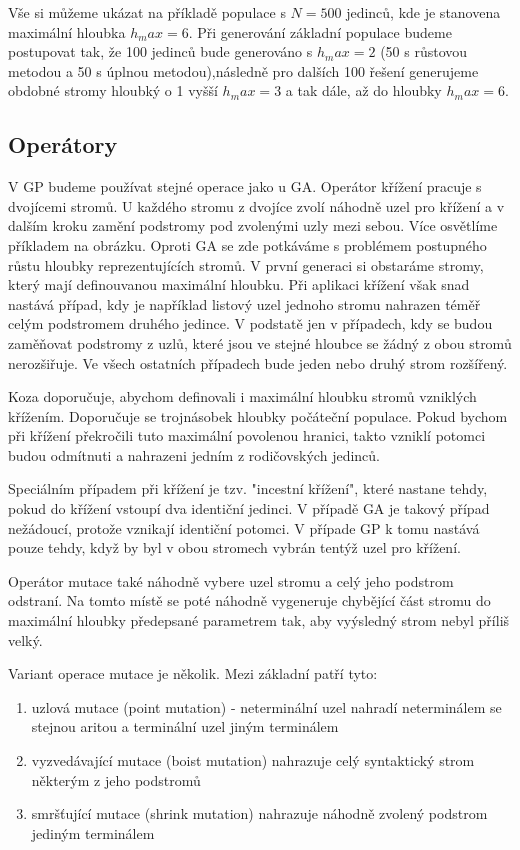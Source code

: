 \documentclass[bc,male,java,dept460]{diploma}		%
\begin{document}
Vše si můžeme ukázat na příkladě populace s $N=500$ jedinců, kde je stanovena maximální hloubka $h_max=6$. Při generování základní populace budeme postupovat tak, že 100 jedinců bude generováno s $h_max=2$ (50 s růstovou metodou a 50 s úplnou metodou),následně pro dalších 100 řešení generujeme obdobné stromy hloubký o 1 vyšší $h_max=3$ a tak dále, až do hloubky $h_max=6$.

\subsection{Operátory}
V GP budeme používat stejné operace jako u GA. Operátor křížení pracuje s dvojícemi stromů. U každého stromu z dvojíce zvolí náhodně uzel pro křížení a v dalším kroku zamění podstromy pod zvolenými uzly mezi sebou. Více osvětlíme příkladem na obrázku. Oproti GA se zde potkáváme s problémem postupného růstu hloubky reprezentujících stromů. V první generaci si obstaráme stromy, který mají definouvanou maximální hloubku. Při aplikaci křížení však snad nastává případ, kdy je například listový uzel jednoho stromu nahrazen téměř celým podstromem druhého jedince. V podstatě jen v případech, kdy se budou zaměňovat podstromy z uzlů, které jsou ve stejné hloubce se žádný z obou stromů nerozšiřuje. Ve všech ostatních případech bude jeden nebo druhý strom rozšířený.

Koza doporučuje, abychom definovali i maximální hloubku stromů vzniklých křížením. Doporučuje se trojnásobek hloubky počáteční populace. Pokud bychom při křížení překročili tuto maximální povolenou hranici, takto vzniklí potomci budou odmítnuti a nahrazeni jedním z rodičovských jedinců.


Speciálním případem při křížení je tzv. "incestní křížení", které nastane tehdy, pokud do křížení vstoupí dva identiční jedinci. V případě GA je takový případ nežádoucí, protože vznikají identiční potomci. V případe GP k tomu nastává pouze tehdy, když by byl v obou stromech vybrán tentýž uzel pro křížení.

Operátor mutace také náhodně vybere uzel stromu a celý jeho podstrom odstraní. Na tomto místě se poté náhodně vygeneruje chybějící část stromu do maximální hloubky předepsané parametrem tak, aby vyýsledný strom nebyl příliš velký. 

Variant operace mutace je několik. Mezi základní patří tyto:
\begin{enumerate}
\item uzlová mutace (point mutation) - neterminální uzel nahradí neterminálem se stejnou aritou a terminální uzel jiným terminálem
\item vyzvedávající mutace (boist mutation) nahrazuje celý syntaktický strom některým z jeho podstromů
\item smršťující mutace (shrink mutation) nahrazuje náhodně zvolený podstrom jediným terminálem
\end{enumerate}
\end{document}
